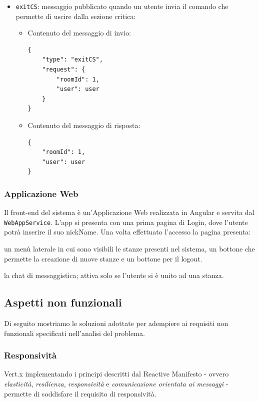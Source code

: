 \documentclass[a4paper]{article}
\begin{document}
\begin{itemize}
    \item \texttt{exitCS}: messaggio pubblicato quando un utente invia il comando che permette di uscire dalla sezione critica:
       \begin{itemize}
            \item Contenuto del messaggio di invio:
            \begin{verbatim}
{
    "type": "exitCS",
    "request": {
        "roomId": 1,
        "user": user
    }
}
            \end{verbatim}
            \item Contenuto del messaggio di risposta:
            \begin{verbatim}
{
    "roomId": 1,
    "user": user
}
            \end{verbatim}
        \end{itemize}

\end{itemize}

\subsubsection{Applicazione Web}
Il front-end del sistema è un'Applicazione Web realizzata in Angular e servita dal \texttt{WebAppService}.
L'app si presenta con una prima pagina di Login, dove l'utente potrà inserire il suo nickName.
Una volta effettuato l'accesso la pagina presenta:
\begin{enumerate*}[label=(\arabic*)]
    \item un menù laterale in cui sono visibili le stanze presenti nel sistema, un bottone che permette la creazione di nuove stanze e un bottone per il logout.
    \item la chat di messaggistica; attiva solo se l'utente si è unito ad una stanza.
\end{enumerate*}

\subsection{Aspetti non funzionali}
Di seguito mostriamo le soluzioni adottate per adempiere ai requisiti non funzionali specificati nell'analisi del problema.

\subsubsection{Responsività}
Vert.x implementando i principi descritti dal Reactive Manifesto - ovvero \textit{elasticità}, \textit{resilienza}, \textit{responsività} e \textit{comunicazione orientata ai messaggi} - permette di soddisfare il requisito di responsività.
\end{document}
